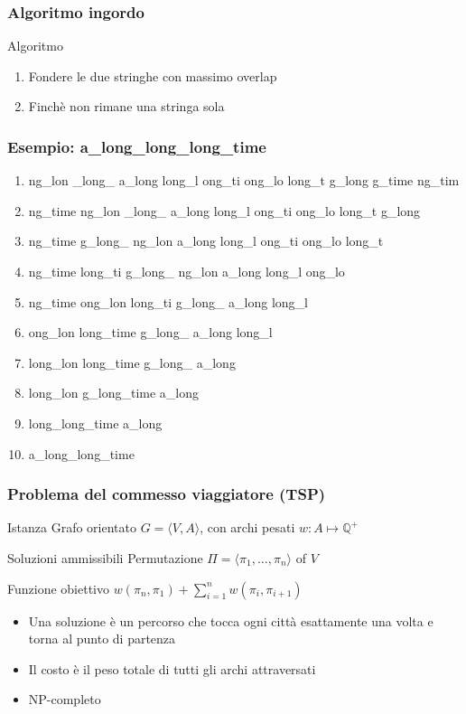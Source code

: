 \begin{frame}[fragile]
\frametitle{Algoritmo ingordo}
\begin{block}{Algoritmo}
\begin{enumerate}
\item
Fondere le due stringhe con massimo overlap
\item
Finchè non rimane una stringa sola
\end{enumerate}
\end{block}
\end{frame}

\begin{frame}[fragile]
\frametitle{Esempio: a\_long\_long\_long\_time}
\begin{enumerate}
\item 
ng\_lon \_long\_ a\_long long\_l ong\_ti ong\_lo long\_t g\_long 
\alert{g\_time ng\_tim}
\item
  ng\_time ng\_lon 
\alert{\_long\_}
 a\_long long\_l ong\_ti ong\_lo long\_t 
\alert{g\_long}
\item
  ng\_time g\_long\_ ng\_lon a\_long long\_l 
\alert{ong\_ti}
 ong\_lo 
\alert{long\_t}
\item
  ng\_time long\_ti g\_long\_ 
\alert{ng\_lon}
 a\_long long\_l 
\alert{ong\_lo}
\item
\alert{ng\_time}
 ong\_lon 
\alert{long\_ti}
 g\_long\_ a\_long long\_l 
\item
\alert{ong\_lon}
 long\_time g\_long\_ a\_long 
long\_l\alert{}
\item
  long\_lon 
\alert{long\_time g\_long\_}
 a\_long 
\item
\alert{long\_lon g\_long\_time}
 a\_long 
\item
\alert{long\_long\_time a\_long}
\item
  a\_long\_long\_time
  \end{enumerate}
  \end{frame}

  
\begin{frame}[fragile]
\frametitle{Problema del commesso viaggiatore (TSP)}
\begin{block}{Istanza}
Grafo orientato $G=\langle  V,A \rangle$, con archi pesati $w:A \mapsto \mathbb{Q}^{+}$
\end{block}
\begin{block}{Soluzioni ammissibili}
Permutazione $\Pi=\langle  \pi_{1}, \ldots,  \pi_{n} \rangle$ of $V$
\end{block}
\begin{block}{Funzione obiettivo}
$w(\pi_{n},\pi_{1}) + \sum_{i=1}^{n} w(\pi_{i},\pi_{i+1})$
\end{block}
\begin{itemize}
\item
Una soluzione è un percorso che tocca ogni città esattamente una volta e torna
al punto di partenza
\item
Il costo è il peso totale di tutti gli archi attraversati
\item
NP-completo
\end{itemize}
\end{frame}

